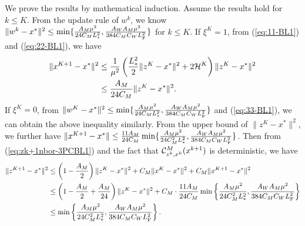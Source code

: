 \documentclass[11pt]{article}
\begin{document}
	We prove the results by mathematical induction. Assume the results hold for $k\leq K$. From the update rule of $w^k$, we know $\|w^k - x^*\|^2 \leq \min\{  \frac{A_M \mu^2}{24C_M L_{*}^2}, \frac{A_WA_M \mu^2}{384C_MC_WL_{\rm F}^2}  \}$ for $k\leq K$. If $\xi^K=1$, from (\ref{eq:11-BL1}) and (\ref{eq:22-BL1}), we have 
	\begin{align}
		\|x^{K+1} - x^*\|^2 & \leq \frac{1}{\mu^2} \left(  \frac{L_{*}^2}{2} \|z^K-x^*\|^2 + 2{\cal H}^K  \right) \|z^K-x^*\|^2 \label{eq:xk+1-3PCBL1} \\ 
		& \leq \frac{A_M}{24C_M} \|z^K-x^*\|^2. \nonumber
	\end{align}
	If $\xi^K=0$, from $\|w^K - x^*\|^2 \leq  \min\{  \frac{A_M \mu^2}{24C_M L_{*}^2}, \frac{A_WA_M \mu^2}{384C_MC_WL_{\rm F}^2}  \}$ and (\ref{eq:33-BL1}), we can obtain the above inequality similarly. From the upper bound of $\|z^K-x^*\|^2$, we further have $\|x^{K+1} -x^*\| \leq \frac{11A_M}{24C_M} \min\{  \frac{A_M \mu^2}{24C_M^2 L_{*}^2}, \frac{A_WA_M \mu^2}{384C_MC_WL_{\rm F}^2}  \}$. Then from (\ref{eq:zk+1nbor-3PCBL1}) and the fact that ${\mathcal{C}}^M_{z^k, x^k}(x^{k+1})$ is deterministic, we have 
	\begin{align*}
		\|z^{K+1}-x^*\|^2 & \leq \left(  1 - \frac{A_M}{2}  \right) \|z^K-x^*\|^2 + C_M\|x^K-x^*\|^2 + C_M\|x^{K+1}-x^*\|^2 \\ 
		& \leq \left(   1 - \frac{A_M}{2}  + \frac{A_M}{24}  \right) \|z^K-x^*\|^2 + C_M \cdot  \frac{11A_M}{24C_M} \min\left\{  \frac{A_M \mu^2}{24C_M^2 L_{*}^2}, \frac{A_WA_M \mu^2}{384C_MC_WL_{\rm F}^2}  \right\} \\ 
		& \leq \min\left\{  \frac{A_M \mu^2}{24C_M^2 L_{*}^2}, \frac{A_WA_M \mu^2}{384C_MC_WL_{\rm F}^2}  \right\}. 
	\end{align*}
	
\end{document}
